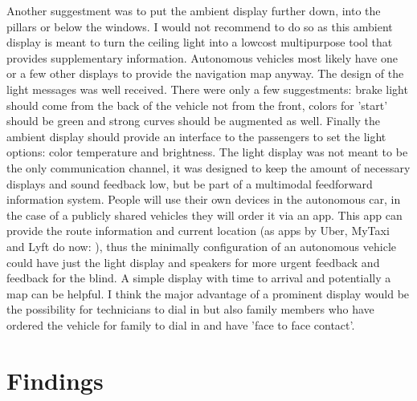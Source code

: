 Another suggestment was to put the ambient display further down, into the pillars or below the windows. I would not recommend to do so as this ambient display is meant to turn the ceiling light into a lowcost multipurpose tool that provides supplementary information. Autonomous vehicles most likely have one or a few other displays to provide the navigation map anyway. 
The design of the light messages was well received. There were only a few suggestments: brake light should come from the back of the vehicle not from the front, colors for 'start' should be green and strong curves should be augmented as well. Finally the ambient display should provide an interface to the passengers to set the light options: color temperature and brightness. 
The light display was not meant to be the only communication channel, it was designed to keep the amount of necessary displays and sound feedback low, but be part of a multimodal feedforward information system. People will use their own devices in the autonomous car, in the case of a publicly shared vehicles they will order it via an app. This app can provide the route information and current location (as apps by Uber, MyTaxi and Lyft do now: ), thus the minimally configuration of an autonomous vehicle could have just the light display and speakers for more urgent feedback and feedback for the blind. A simple display with time to arrival and potentially a map can be helpful. I think the major advantage of a prominent display would be the possibility for technicians to dial in but also family members who have ordered the vehicle for family to dial in and have 'face to face contact'.

\section{Findings}
\label{sec:findings}
